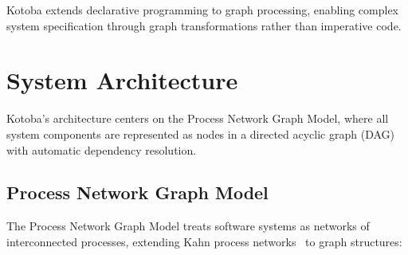 \documentclass[11pt,a4paper]{article}
\begin{document}
Kotoba extends declarative programming to graph processing, enabling complex system specification through graph transformations rather than imperative code.

\section{System Architecture}
\label{sec:architecture}

Kotoba's architecture centers on the Process Network Graph Model, where all system components are represented as nodes in a directed acyclic graph (DAG) with automatic dependency resolution.

\subsection{Process Network Graph Model}
\label{subsec:process_model}

The Process Network Graph Model treats software systems as networks of interconnected processes, extending Kahn process networks~\cite{kahn1974} to graph structures:
\end{document}
